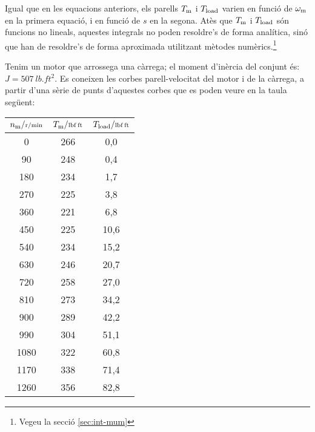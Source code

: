 Igual que en les equacions anteriors, els parells $T_\mathrm{m}$ i $T_\mathrm{load}$ varien en funció de $\omega_\mathrm{m}$ en la primera equació, i en funció de $s$ en la segona. Atès que $T_\mathrm{m}$ i $T_\mathrm{load}$ són funcions no lineals, aquestes integrals no poden resoldre's de forma analítica, sinó que han de resoldre's de forma aproximada utilitzant mètodes numèrics.\footnote{Vegeu la secció \ref{sec:int-mum}}


\begin{exemple}\label{ex:MotTempsArr}
	\addcontentsxms{\MotTempsArr}
Tenim un motor que arrossega una càrrega; el moment d'inèrcia del conjunt és: $J = \qty{507}{lb.ft^2}$. Es coneixen les corbes parell-velocitat del motor i de la càrrega, a partir d'una sèrie de punts d'aquestes corbes que es poden veure en la taula següent:

\begin{center}
    \begin{tabular}{S[table-format=4.0]S[table-format=3.0]S[table-format=3.1]}
    \toprule[1pt]
    $n\ped{m}/{\scriptstyle \unit{r/min}}$ &  $T\ped{m}/{\scriptstyle \unit{lbf.ft}}$   & $T\ped{load}/{\scriptstyle \unit{lbf.ft}}$  \\
    	   &  266  &   0,0    \\
     90	   &  248  &   0,4    \\
     180   &  234  &   1,7    \\
     270   &  225  &   3,8    \\
     360   &  221  &   6,8    \\
     450   &  225  &   10,6   \\
     540   &  234  &   15,2   \\
     630   &  246  &   20,7   \\
     720   &  258  &   27,0   \\
     810   &  273  &   34,2   \\
     900   &  289  &   42,2   \\
     990   &  304  &   51,1   \\
     1080  &  322  &   60,8   \\
     1170  &  338  &   71,4   \\
     1260  &  356  &   82,8   \\
     \midrule
    \end{tabular}
\end{center}


\end{exemple}

